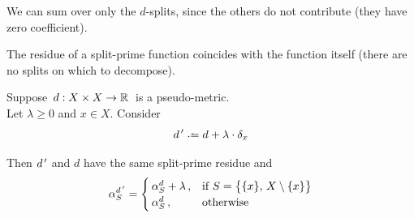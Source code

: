 \documentclass[./main.tex]{subfiles}
\begin{document}
\begin{remark}
    We can sum over only the $d$-splits, since the others do not contribute (they have zero coefficient).
\end{remark}

\begin{remark}
    The residue of a split-prime function coincides with the function itself (there are no splits on which to decompose).
\end{remark}

\begin{corollary}[{\cites[Corollary 2]{BD92a}}] \label{cor:cor2}
    Suppose $\, d : {X \times X} \to \mathbb{R} \,$ is a pseudo-metric. \\
    Let $\lambda \geq 0$ and $x \in X$. Consider
    \[ \dpr \defeq d + \lambda \cdot \delta_x \nospblw \]

    Then ${d^{\,\prime}}$ and $d$ have the same split-prime residue and
    \[ \alpha_S^\dpr = 
        \begin{cases}
        \, \alpha_S^d + \lambda \,, & \text{if}\ S = \bigl\{ \{x\},\, X \setminus \{x\} \bigr\} \\
        \, \alpha_S^d \,,           & \text{otherwise}
        \end{cases}
    \nospblw \]
\end{corollary}
\end{document}
